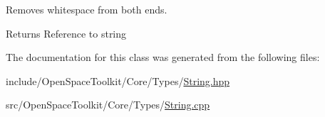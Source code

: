 Removes whitespace from both ends. 

\begin{DoxyReturn}{Returns}
Reference to string 
\end{DoxyReturn}


The documentation for this class was generated from the following files\+:\begin{DoxyCompactItemize}
\item 
include/\+Open\+Space\+Toolkit/\+Core/\+Types/\hyperlink{_string_8hpp}{String.\+hpp}\item 
src/\+Open\+Space\+Toolkit/\+Core/\+Types/\hyperlink{_string_8cpp}{String.\+cpp}\end{DoxyCompactItemize}
